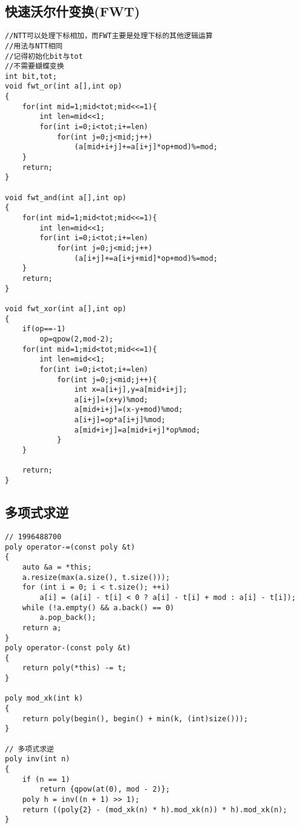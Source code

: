 \documentclass[twocolumn,a4]{article}
\begin{document}
\subsection{快速沃尔什变换(FWT)}
\begin{lstlisting}
//NTT可以处理下标相加，而FWT主要是处理下标的其他逻辑运算
//用法与NTT相同
//记得初始化bit与tot
//不需要蝴蝶变换
int bit,tot;
void fwt_or(int a[],int op)
{
    for(int mid=1;mid<tot;mid<<=1){
        int len=mid<<1;
        for(int i=0;i<tot;i+=len)
            for(int j=0;j<mid;j++)
                (a[mid+i+j]+=a[i+j]*op+mod)%=mod;
    }
    return;
}

void fwt_and(int a[],int op)
{
    for(int mid=1;mid<tot;mid<<=1){
        int len=mid<<1;
        for(int i=0;i<tot;i+=len)
            for(int j=0;j<mid;j++)
                (a[i+j]+=a[i+j+mid]*op+mod)%=mod;
    }
    return;
}

void fwt_xor(int a[],int op)
{
    if(op==-1)
        op=qpow(2,mod-2);
    for(int mid=1;mid<tot;mid<<=1){
        int len=mid<<1;
        for(int i=0;i<tot;i+=len)
            for(int j=0;j<mid;j++){
                int x=a[i+j],y=a[mid+i+j];
                a[i+j]=(x+y)%mod;
                a[mid+i+j]=(x-y+mod)%mod;
                a[i+j]=op*a[i+j]%mod;
                a[mid+i+j]=a[mid+i+j]*op%mod;
            }
    }

    return;
}
\end{lstlisting}

\subsection{多项式求逆}
\begin{lstlisting}
// 1996488700
poly operator-=(const poly &t)
{
    auto &a = *this;
    a.resize(max(a.size(), t.size()));
    for (int i = 0; i < t.size(); ++i)
        a[i] = (a[i] - t[i] < 0 ? a[i] - t[i] + mod : a[i] - t[i]);
    while (!a.empty() && a.back() == 0)
        a.pop_back();
    return a;
}
poly operator-(const poly &t)
{
    return poly(*this) -= t;
}

poly mod_xk(int k)
{
    return poly(begin(), begin() + min(k, (int)size()));
}

// 多项式求逆
poly inv(int n)
{
    if (n == 1)
        return {qpow(at(0), mod - 2)};
    poly h = inv((n + 1) >> 1);
    return ((poly{2} - (mod_xk(n) * h).mod_xk(n)) * h).mod_xk(n);
}
\end{lstlisting}
\end{document}
